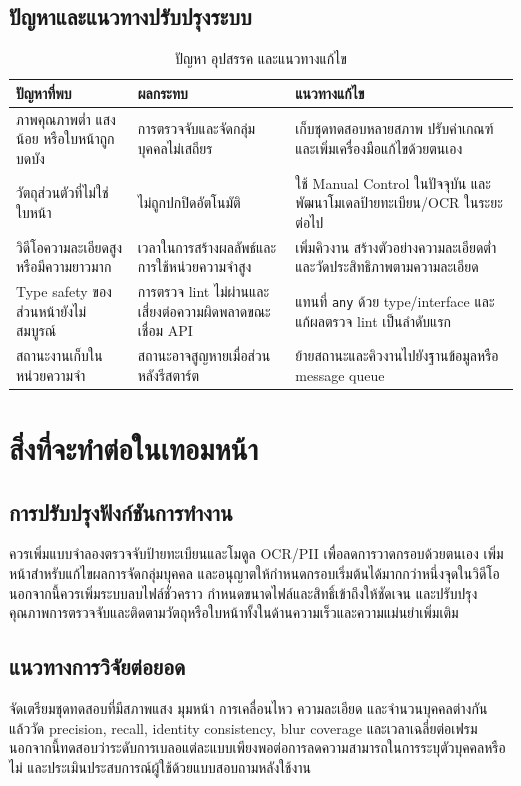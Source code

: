 \subsection{ปัญหาและแนวทางปรับปรุงระบบ}

\begin{table}[H]
\centering
\caption{ปัญหา อุปสรรค และแนวทางแก้ไข}
\label{tab:problems}
\begin{tabular}{|p{}|p{}|p{}|}
\hline
\textbf{ปัญหาที่พบ} & \textbf{ผลกระทบ} & \textbf{แนวทางแก้ไข} \\
\hline
ภาพคุณภาพต่ำ แสงน้อย หรือใบหน้าถูกบดบัง & การตรวจจับและจัดกลุ่มบุคคลไม่เสถียร & เก็บชุดทดสอบหลายสภาพ ปรับค่าเกณฑ์ และเพิ่มเครื่องมือแก้ไขด้วยตนเอง \\
\hline
วัตถุส่วนตัวที่ไม่ใช่ใบหน้า & ไม่ถูกปกปิดอัตโนมัติ & ใช้ Manual Control ในปัจจุบัน และพัฒนาโมเดลป้ายทะเบียน/OCR ในระยะต่อไป \\
\hline
วิดีโอความละเอียดสูงหรือมีความยาวมาก & เวลาในการสร้างผลลัพธ์และการใช้หน่วยความจำสูง & เพิ่มคิวงาน สร้างตัวอย่างความละเอียดต่ำ และวัดประสิทธิภาพตามความละเอียด \\
\hline
Type safety ของส่วนหน้ายังไม่สมบูรณ์ & การตรวจ lint ไม่ผ่านและเสี่ยงต่อความผิดพลาดขณะเชื่อม API & แทนที่ \texttt{any} ด้วย type/interface และแก้ผลตรวจ lint เป็นลำดับแรก \\
\hline
สถานะงานเก็บในหน่วยความจำ & สถานะอาจสูญหายเมื่อส่วนหลังรีสตาร์ต & ย้ายสถานะและคิวงานไปยังฐานข้อมูลหรือ message queue \\
\hline
\end{tabular}
\end{table}

\section{สิ่งที่จะทำต่อในเทอมหน้า}

\subsection{การปรับปรุงฟังก์ชันการทำงาน}

ควรเพิ่มแบบจำลองตรวจจับป้ายทะเบียนและโมดูล OCR/PII เพื่อลดการวาดกรอบด้วยตนเอง เพิ่มหน้าสำหรับแก้ไขผลการจัดกลุ่มบุคคล และอนุญาตให้กำหนดกรอบเริ่มต้นได้มากกว่าหนึ่งจุดในวิดีโอ นอกจากนี้ควรเพิ่มระบบลบไฟล์ชั่วคราว กำหนดขนาดไฟล์และสิทธิ์เข้าถึงให้ชัดเจน และปรับปรุงคุณภาพการตรวจจับและติดตามวัตถุหรือใบหน้าทั้งในด้านความเร็วและความแม่นยำเพิ่มเติม

\subsection{แนวทางการวิจัยต่อยอด}

จัดเตรียมชุดทดสอบที่มีสภาพแสง มุมหน้า การเคลื่อนไหว ความละเอียด และจำนวนบุคคลต่างกัน แล้ววัด precision, recall, identity consistency, blur coverage และเวลาเฉลี่ยต่อเฟรม นอกจากนี้ทดสอบว่าระดับการเบลอแต่ละแบบเพียงพอต่อการลดความสามารถในการระบุตัวบุคคลหรือไม่ และประเมินประสบการณ์ผู้ใช้ด้วยแบบสอบถามหลังใช้งาน
